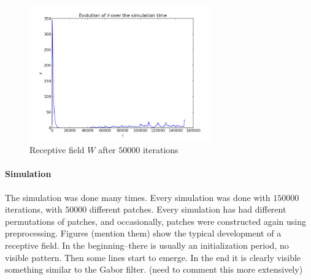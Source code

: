 \begin{figure}[h]
\centering
\includegraphics[width=0.7\textwidth]{../ex3/results1/theta}
\caption{}
\caption{Receptive field $W$ after $50000$ iterations}
\label{fig:theta}
\end{figure}

\paragraph{Simulation}
The simulation was done many times. Every simulation was done with $150000$
iterations, with $50000$ different patches. Every simulation has had different
permutations of patches, and occasionally, patches were constructed again using
preprocessing. Figures (mention them) show the typical development of a
receptive field. In the beginning--there is usually an initialization period, no
visible pattern. Then some lines start to emerge. In the end it is clearly
visible something similar to the Gabor filter. (need to comment this more
extensively)
